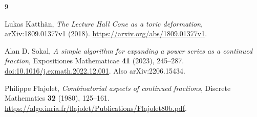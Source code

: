 \documentclass[11pt]{article}
\theoremstyle{remark}
\begin{document}
\begin{thebibliography}{9}

Lukas Katth\"an,
\emph{The Lecture Hall Cone as a toric deformation},
arXiv:1809.01377v1 (2018).
\url{https://arxiv.org/abs/1809.01377v1}.

Alan D. Sokal,
\emph{A simple algorithm for expanding a power series as a continued fraction},
Expositiones Mathematicae \textbf{41} (2023), 245--287.
\href{https://doi.org/10.1016/j.exmath.2022.12.001}{doi:10.1016/j.exmath.2022.12.001}.
Also arXiv:2206.15434.

Philippe Flajolet,
\emph{Combinatorial aspects of continued fractions},
Discrete Mathematics \textbf{32} (1980), 125--161.
\url{https://algo.inria.fr/flajolet/Publications/Flajolet80b.pdf}.

\end{thebibliography}
\end{document}
